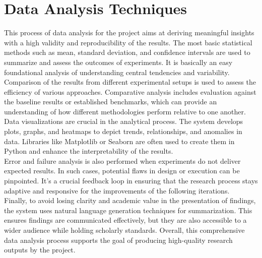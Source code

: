 \section{Data Analysis Techniques}
This process of data analysis for the project aims at deriving meaningful insights with a high validity and reproducibility of the results. The most basic statistical methods such as mean, standard deviation, and confidence intervals are used to summarize and assess the outcomes of experiments. It is basically an easy foundational analysis of understanding central tendencies and variability.
Comparison of the results from different experimental setups is used to assess the efficiency of various approaches. Comparative analysis includes evaluation against the baseline results or established benchmarks, which can provide an understanding of how different methodologies perform relative to one another.
Data visualizations are crucial in the analytical process. The system develops plots, graphs, and heatmaps to depict trends, relationships, and anomalies in data. Libraries like Matplotlib or Seaborn are often used to create them in Python and enhance the interpretability of the results.\\
Error and failure analysis is also performed when experiments do not deliver expected results. In such cases, potential flaws in design or execution can be pinpointed. It's a crucial feedback loop in ensuring that the research process stays adaptive and responsive for the improvements of the following iterations.\\
Finally, to avoid losing clarity and academic value in the presentation of findings, the system uses natural language generation techniques for summarization. This ensures findings are communicated effectively, but they are also accessible to a wider audience while holding scholarly standards. Overall, this comprehensive data analysis process supports the goal of producing high-quality research outputs by the project.


